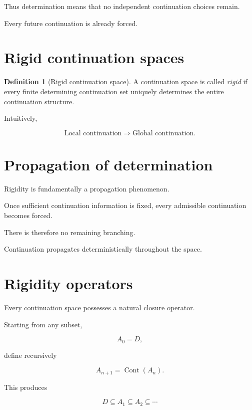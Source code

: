 \documentclass[13pt,openany]{book}
\theoremstyle{plain}
\theoremstyle{definition}
\newtheorem{definition}{Definition}[chapter]
\begin{document}
Thus determination means that no independent continuation choices remain.

Every future continuation is already forced.


\section{Rigid continuation spaces}

\begin{definition}[Rigid continuation space]
A continuation space is called
\emph{rigid}
if every finite determining continuation set uniquely determines the entire continuation structure.
\end{definition}

Intuitively,

\[
\boxed{
\text{Local continuation}
\Longrightarrow
\text{Global continuation}.
}
\]


\section{Propagation of determination}

Rigidity is fundamentally a propagation phenomenon.

Once sufficient continuation information is fixed,
every admissible continuation becomes forced.

There is therefore no remaining branching.

Continuation propagates deterministically throughout the space.


\section{Rigidity operators}

Every continuation space possesses a natural closure operator.

Starting from any subset,

\[
A_0=D,
\]

define recursively

\[
A_{n+1}
=
\operatorname{Cont}(A_n).
\]

This produces

\[
D
\subseteq
A_1
\subseteq
A_2
\subseteq
\cdots
\]
\end{document}

